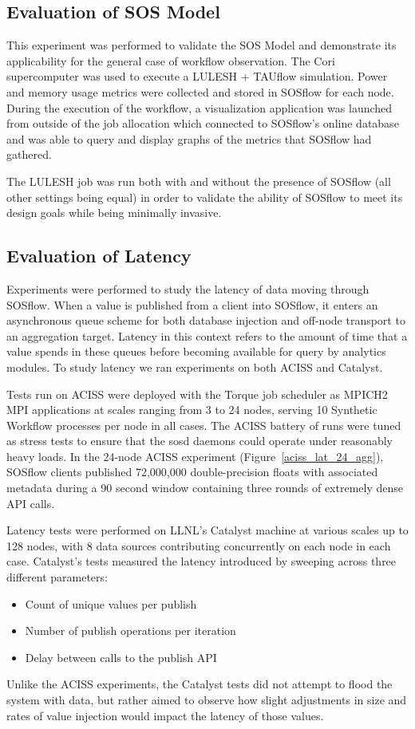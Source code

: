 \subsection{Evaluation of SOS Model} %
This experiment was performed to validate the SOS Model and
demonstrate its applicability for the general case of workflow
observation.
%
The Cori supercomputer was used to execute a LULESH + TAUflow simulation. 
%
Power and memory usage metrics were collected and stored in SOSflow for
each node.
%
During the execution of the workflow, a visualization application was
launched from outside of the job allocation which connected to
SOSflow's online database and was able to query and display graphs of
the metrics that SOSflow had gathered.
%
\par
%
The LULESH job was run both with and without the presence of SOSflow
(all other settings being equal) in order to validate the ability of
SOSflow to meet its design goals while being minimally invasive.
%
%


\subsection{Evaluation of Latency} %
Experiments were performed to study the latency of data moving
through SOSflow.
%
When a value is published from a client into SOSflow,
it enters an asynchronous queue scheme for both database injection
and off-node transport to an aggregation target.
%
Latency in this context refers to the amount of time that a value
spends in these queues before becoming available for query by
analytics modules.
%
To study latency we ran experiments on both ACISS and Catalyst.
% 
\par
%
Tests run on ACISS were
deployed with the Torque job scheduler as MPICH2 MPI applications at
scales ranging from 3 to 24 nodes, serving 10 Synthetic Workflow processes per node in all cases.
%
The ACISS battery of runs were tuned as stress tests to ensure that
the sosd daemons could operate under reasonably heavy loads.
%
In the 24-node ACISS experiment (Figure~\ref{aciss_lat_24_agg}),
SOSflow clients published 72,000,000 double-precision floats
with associated metadata during a 90 second window containing three
rounds of extremely dense API calls.
%
\par
%
Latency tests were performed on LLNL's Catalyst machine at
various scales up to 128 nodes, with 8 data sources contributing
concurrently on each node in each case.
%
Catalyst's tests measured the latency introduced by sweeping across three
different parameters:
\begin{itemize}
\item Count of unique values per publish
\item Number of publish operations per iteration
\item Delay between calls to the publish API
\end{itemize}
%
Unlike the ACISS experiments, the Catalyst tests did not attempt to
flood the system with data, but rather aimed to observe how slight
adjustments in size and rates of value injection would impact the
latency of those values.
%
%




